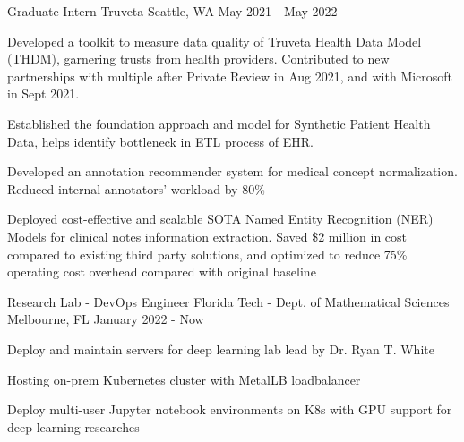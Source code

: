 \begin{cventries}

	\cventry
	{Graduate Intern}
	{Truveta}
	{Seattle, WA}
	{May 2021 - May 2022}
	{\begin{cvitems}
			\item {Developed a toolkit to measure data quality of Truveta Health Data Model (THDM), garnering trusts from health providers. Contributed to new partnerships with multiple after Private Review in Aug 2021, and with Microsoft in Sept 2021.}
			\item {Established the foundation approach and model for Synthetic Patient Health Data, helps identify bottleneck in ETL process of EHR.}
			\item {Developed an annotation recommender system for medical concept normalization. Reduced internal annotators' workload by 80\%}
			\item {Deployed cost-effective and scalable SOTA Named Entity Recognition (NER) Models for clinical notes information extraction. Saved \$2 million in cost compared to existing third party solutions, and optimized to reduce 75\% operating cost overhead compared with original baseline}
		\end{cvitems}}
	\vspace{-3mm}

	\cventry
	{Research Lab - DevOps Engineer}
	{Florida Tech - Dept. of Mathematical Sciences}
	{Melbourne, FL}
	{January 2022 - Now}
	{\begin{cvitems}
			\item {Deploy and maintain servers for deep learning lab lead by Dr. Ryan T. White}
			\item {Hosting on-prem Kubernetes cluster with MetalLB loadbalancer}
			\item {Deploy multi-user Jupyter notebook environments on K8s with GPU support for deep learning researches}
		\end{cvitems}}
	\vspace{-5mm}


\end{cventries}
